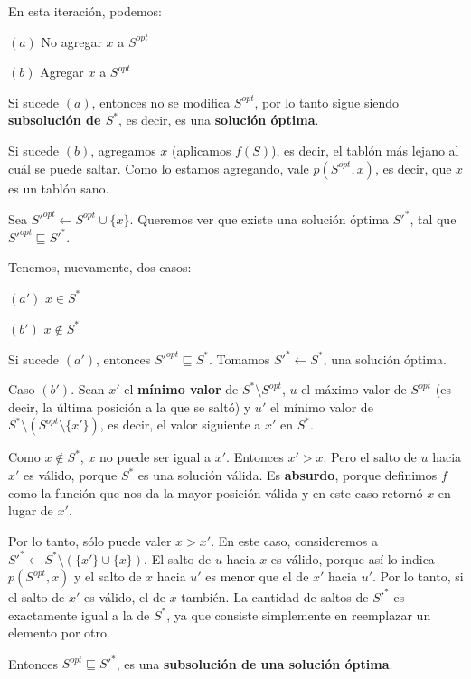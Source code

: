 \begin{itemize}
\begin{itemize}
    En esta iteración, podemos: \medskip
    
    $(a)$ No agregar $x$ a $S^{opt}$
    
    $(b)$ Agregar $x$ a $S^{opt}$ \medskip
    
    Si sucede $(a)$, entonces no se modifica $S^{opt}$, por lo tanto sigue
    siendo \textbf{subsolución de $S^{*}$}, es decir, es una \textbf{solución óptima}. \medskip
    
    Si sucede $(b)$, agregamos $x$ (aplicamos $f(S)$), es decir, el tablón más
    lejano al cuál se puede saltar. Como lo estamos agregando, vale
    $p(S^{opt}, x)$, es decir, que $x$ es un tablón sano. \medskip
    
    Sea $S'^{opt} \gets S^{opt} \cup \{x\}$. Queremos ver que existe una
    solución óptima $S'^{*}$, tal que $S'^{opt} \sqsubseteq S'^{*}$. \medskip
    
    Tenemos, nuevamente, dos casos: \medskip 
    
    $(a')$ $x \in S^{*}$
    
    $(b')$ $x \notin S^{*}$ \medskip
    
    Si sucede $(a')$, entonces $S'^{opt} \sqsubseteq S^{*}$. 
    Tomamos $S'^{*} \gets S^{*}$, una solución óptima. \medskip 
    
    Caso $(b')$. Sean $x'$ el \textbf{mínimo valor} de $S^{*} \setminus S^{opt}$, 
    $u$ el máximo valor de $S^{opt}$ (es decir, la última posición a la que
    se saltó) y $u'$ el mínimo valor de $S^{*} \setminus (S^{opt} \setminus \{x'\})$, es
    decir, el valor siguiente a $x'$ en $S^{*}$.
    
    Como $x \notin S^{*}$, $x$ no puede ser igual a $x'$. Entonces $x' > x$.
    Pero el salto de $u$ hacia $x'$ es válido, porque $S^{*}$ es una solución
    válida. Es \textbf{absurdo}, porque definimos $f$ como la función que nos
    da la mayor posición válida y en este caso retornó $x$ en lugar de $x'$.
    
    Por lo tanto, sólo puede valer $x > x'$. En este caso, consideremos a
    $S'^{*} \gets S^{*} \setminus (\{x'\} \cup \{x\})$. El salto de $u$ hacia $x$ es
    válido, porque así lo indica $p(S^{opt}, x)$ y el salto de $x$ hacia $u'$
    es menor que el de $x'$ hacia $u'$. Por lo tanto, si el salto de $x'$ es válido,
    el de $x$ también. La cantidad de saltos de $S'^{*}$ es exactamente igual a la de 
    $S^{*}$, ya que consiste simplemente en reemplazar un elemento por otro.
    
    Entonces $S^{opt} \sqsubseteq S'^{*}$, es una \textbf{subsolución de una solución óptima}.
    

\end{itemize}
\end{itemize}
